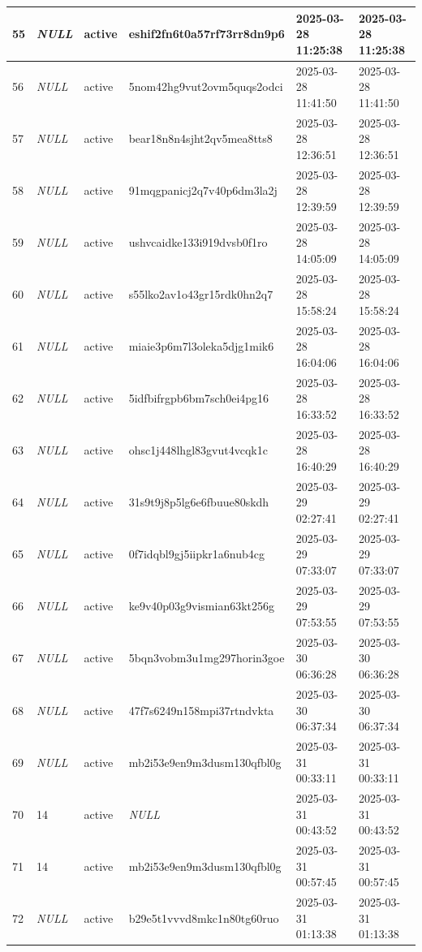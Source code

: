 \begin{longtable}{|l|l|l|l|l|l|}
55 & \textit{NULL} & active & eshif2fn6t0a57rf73rr8dn9p6 & 2025-03-28 11:25:38 & 2025-03-28 11:25:38 \\ \hline 
56 & \textit{NULL} & active & 5nom42hg9vut2ovm5quqs2odci & 2025-03-28 11:41:50 & 2025-03-28 11:41:50 \\ \hline 
57 & \textit{NULL} & active & bear18n8n4sjht2qv5mea8tts8 & 2025-03-28 12:36:51 & 2025-03-28 12:36:51 \\ \hline 
58 & \textit{NULL} & active & 91mqgpanicj2q7v40p6dm3la2j & 2025-03-28 12:39:59 & 2025-03-28 12:39:59 \\ \hline 
59 & \textit{NULL} & active & ushvcaidke133i919dvsb0f1ro & 2025-03-28 14:05:09 & 2025-03-28 14:05:09 \\ \hline 
60 & \textit{NULL} & active & s55lko2av1o43gr15rdk0hn2q7 & 2025-03-28 15:58:24 & 2025-03-28 15:58:24 \\ \hline 
61 & \textit{NULL} & active & miaie3p6m7l3oleka5djg1mik6 & 2025-03-28 16:04:06 & 2025-03-28 16:04:06 \\ \hline 
62 & \textit{NULL} & active & 5idfbifrgpb6bm7sch0ei4pg16 & 2025-03-28 16:33:52 & 2025-03-28 16:33:52 \\ \hline 
63 & \textit{NULL} & active & ohsc1j448lhgl83gvut4vcqk1c & 2025-03-28 16:40:29 & 2025-03-28 16:40:29 \\ \hline 
64 & \textit{NULL} & active & 31s9t9j8p5lg6e6fbuue80skdh & 2025-03-29 02:27:41 & 2025-03-29 02:27:41 \\ \hline 
65 & \textit{NULL} & active & 0f7idqbl9gj5iipkr1a6nub4cg & 2025-03-29 07:33:07 & 2025-03-29 07:33:07 \\ \hline 
66 & \textit{NULL} & active & ke9v40p03g9vismian63kt256g & 2025-03-29 07:53:55 & 2025-03-29 07:53:55 \\ \hline 
67 & \textit{NULL} & active & 5bqn3vobm3u1mg297horin3goe & 2025-03-30 06:36:28 & 2025-03-30 06:36:28 \\ \hline 
68 & \textit{NULL} & active & 47f7s6249n158mpi37rtndvkta & 2025-03-30 06:37:34 & 2025-03-30 06:37:34 \\ \hline 
69 & \textit{NULL} & active & mb2i53e9en9m3dusm130qfbl0g & 2025-03-31 00:33:11 & 2025-03-31 00:33:11 \\ \hline 
70 & 14 & active & \textit{NULL} & 2025-03-31 00:43:52 & 2025-03-31 00:43:52 \\ \hline 
71 & 14 & active & mb2i53e9en9m3dusm130qfbl0g & 2025-03-31 00:57:45 & 2025-03-31 00:57:45 \\ \hline 
72 & \textit{NULL} & active & b29e5t1vvvd8mkc1n80tg60ruo & 2025-03-31 01:13:38 & 2025-03-31 01:13:38 \\ \hline 

\end{longtable}
